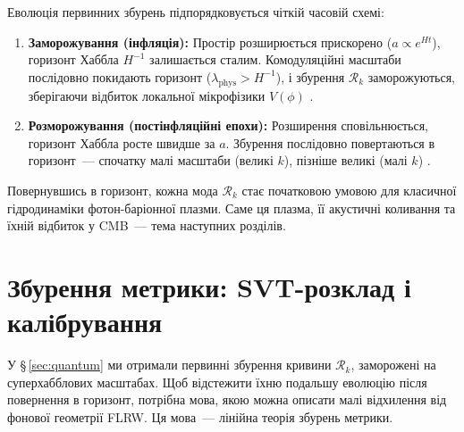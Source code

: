 \documentclass[12pt, a4paper]{article}
\begin{document}
Еволюція первинних збурень підпорядковується чіткій часовій
схемі:
\begin{enumerate}
  \item \textbf{Заморожування (інфляція):} Простір розширюється
        прискорено ($a \propto e^{Ht}$), горизонт Хаббла
        $H^{-1}$ залишається сталим. Комодуляційні масштаби
        послідовно покидають горизонт ($\lambda_\mathrm{phys} >
        H^{-1}$), і збурення $\mathcal{R}_k$ заморожуються,
        зберігаючи відбиток локальної мікрофізики $V(\phi)$
        \cite{bardeen_1980}.
  \item \textbf{Розморожування (постінфляційні епохи):}
        Розширення сповільнюється, горизонт Хаббла росте
        швидше за $a$. Збурення послідовно повертаються в
        горизонт~--- спочатку малі масштаби (великі $k$),
        пізніше великі (малі $k$) \cite{mukhanov_2005}.
\end{enumerate}

Повернувшись в горизонт, кожна мода $\mathcal{R}_k$ стає
початковою умовою для класичної гідродинаміки фотон-баріонної
плазми. Саме ця плазма, її акустичні коливання та їхній відбиток
у CMB~--- тема наступних розділів.


\section{Збурення метрики: SVT-розклад і калібрування}
\label{sec:metric}

У §\,\ref{sec:quantum} ми отримали первинні збурення кривини
$\mathcal{R}_k$, заморожені на суперхабблових масштабах.
Щоб відстежити їхню подальшу еволюцію після повернення в
горизонт, потрібна мова, якою можна описати малі відхилення
від фонової геометрії FLRW. Ця мова~--- лінійна теорія збурень
метрики.
\end{document}
